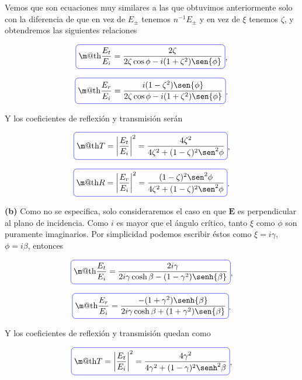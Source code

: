 \documentclass[a4paper,11pt]{article}
\makeatletter
\numberwithin{equation}{section}
\newcommand*{\boxcolor}{blue}
\renewcommand{\boxed}[1]{\textcolor{\boxcolor}{%
\tikz[baseline={([yshift=-1ex]current bounding box.center)}] \node [rectangle, minimum width=1ex,rounded corners,draw] {\normalcolor\m@th$\displaystyle#1$};}}
\makeatother
\begin{document}
Vemos que son ecuaciones muy similares a las que obtuvimos anteriormente solo con 
la diferencia de que en vez de $E_{\pm}$ tenemos $n^{-1}E_{\pm}$ y en vez de $\xi$ 
tenemos $\zeta$, y obtendremos las siguientes relaciones 

\begin{equation}
 \boxed{\frac{E_t}{E_i} = \frac{2\zeta}{2\zeta\cos{\phi} - i(1 + \zeta^2)\sen{\phi}}},
\end{equation}

\begin{equation}
 \boxed{\frac{E_r}{E_i} = \frac{i(1 - \zeta^2)\sen{\phi}}{2\zeta\cos{\phi} - i(1 + \zeta^2)
 \sen{\phi}}}.
\end{equation}

Y los coeficientes de reflexión y transmisión serán 

\begin{equation}
 \boxed{T = \left|\frac{E_t}{E_i} \right|^2 = \frac{4\zeta^2}{4\zeta^2 + 
 (1 - \zeta)^2\sen^2{\phi}}},
\end{equation}

\begin{equation}
 \boxed{R = \left|\frac{E_r}{E_i} \right|^2 = \frac{(1 - \zeta)^2\sen^2{\phi}}{4\zeta^2 + 
 (1 - \zeta)^2\sen^2{\phi}}}.
\end{equation}

\textbf{(b)} Como no se especifica, solo consideraremos el caso en que $\mathbf{E}$ es
perpendicular al plano de incidencia. Como $i$ es mayor que el ángulo crítico, tanto 
$\xi$ como $\phi$ son puramente imaginarios. Por simplicidad podemos escribir éstos 
como $\xi = i\gamma$, $\phi = i\beta$, entonces 

\begin{equation}
 \boxed{\frac{E_t}{E_i} = \frac{2i\gamma}{2i\gamma\cosh{\beta} - (1 - \gamma^2)\senh{\beta}}},
\end{equation}

\begin{equation}
 \boxed{\frac{E_r}{E_i} = \frac{-(1 + \gamma^2)\senh{\beta}}{2i\gamma\cosh{\beta} + (1 + \gamma^2)
 \sen{\beta}}}.
\end{equation}

Y los coeficientes de reflexión y transmisión quedan como

\begin{equation}
 \boxed{T = \left|\frac{E_t}{E_i} \right|^2 = \frac{4\gamma^2}{4\gamma^2 + 
 (1 - \gamma)^2\senh^2{\beta}}},
\end{equation}
\end{document}
